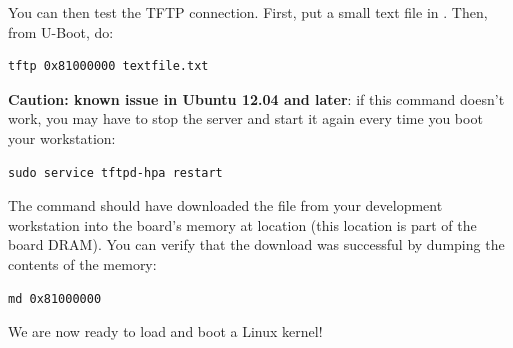 You can then test the TFTP connection.  First, put a small text
file in . Then, from U-Boot, do:

\begin{verbatim}
tftp 0x81000000 textfile.txt
\end{verbatim}

{\bf Caution: known issue in Ubuntu 12.04 and later}: if this command
doesn't work, you may have to stop the server and start it
again every time you boot your workstation:

\begin{verbatim}
sudo service tftpd-hpa restart
\end{verbatim}

The  command should have downloaded the
 file from your development workstation into the
board's memory at location  (this location is part of
the board DRAM). You can verify that the download was successful by
dumping the contents of the memory:

\begin{verbatim}
md 0x81000000
\end{verbatim}

We are now ready to load and boot a Linux kernel!
